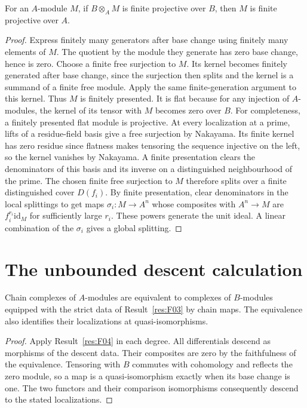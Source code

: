 \begin{corollary}\label{res:F05}
For an \(A\)-module \(M\), if \(B\otimes_A M\) is finite projective
over \(B\), then \(M\) is finite projective over \(A\).
\end{corollary}
\begin{proof}
Express finitely many generators after base change using finitely many
elements of \(M\). The quotient by the module they generate has zero
base change, hence is zero. Choose a finite free surjection to \(M\).
Its kernel becomes finitely generated after base change, since the
surjection then splits and the kernel is a summand of a finite free
module. Apply the same finite-generation argument to this kernel.
Thus \(M\) is finitely presented.
It is flat because for any injection of \(A\)-modules, the kernel of
its tensor with \(M\) becomes zero over \(B\).
For completeness, a finitely presented flat module is projective.
At every localization at a prime, lifts of a residue-field basis
give a free surjection by Nakayama. Its finite kernel has zero
residue since flatness makes tensoring the sequence injective on
the left, so the kernel vanishes by Nakayama. A finite presentation
clears the denominators of this basis and its inverse on a
distinguished neighbourhood of the prime. The chosen finite free
surjection to \(M\) therefore splits over a finite distinguished
cover \(D(f_i)\). By finite presentation, clear denominators in the
local splittings to get maps \(\sigma_i:M\to A^n\) whose composites
with \(A^n\to M\) are \(f_i^{r_i}\mathrm{id}_M\) for sufficiently
large \(r_i\). These powers generate the unit ideal. A linear
combination of the \(\sigma_i\) gives a global splitting.
\end{proof}

\section{The unbounded descent calculation}

\begin{proposition}\label{res:F06}
Chain complexes of \(A\)-modules are equivalent to complexes of
\(B\)-modules equipped with the strict data of Result~\ref{res:F03}
by chain maps. The equivalence also identifies their localizations
at quasi-isomorphisms.
\end{proposition}
\begin{proof}
Apply Result~\ref{res:F04} in each degree. All differentials descend
as morphisms of the descent data. Their composites are zero by the
faithfulness of the equivalence. Tensoring with \(B\) commutes with
cohomology and reflects the zero module, so a map is a
quasi-isomorphism exactly when its base change is one.
The two functors and their comparison isomorphisms consequently
descend to the stated localizations.
\end{proof}

